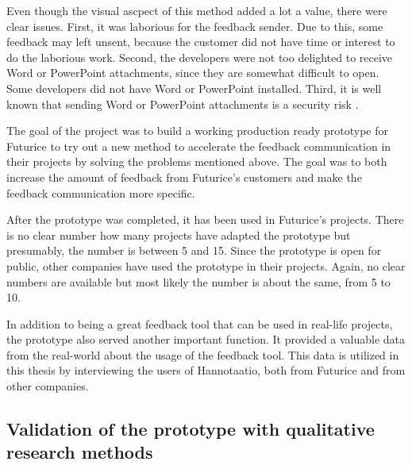 \documentclass[english,12pt,a4paper,pdftex]{article}
\begin{document}
Even though the visual ascpect of this method added a lot a value, there were clear issues. First, it was laborious for the feedback sender. Due to this, some feedback may left unsent, because the customer did not have time or interest to do the laborious work. Second, the developers were not too delighted to receive Word or PowerPoint attachments, since they are somewhat difficult to open. Some developers did not have Word or PowerPoint installed. Third, it is well known that sending Word or PowerPoint attachments is a security risk \citep{tyson2011}.

The goal of the project was to build a working production ready prototype for Futurice to try out a new method to accelerate the feedback communication in their projects by solving the problems mentioned above. The goal was to both increase the amount of feedback from Futurice's customers and make the feedback communication more specific.

After the prototype was completed, it has been used in Futurice's projects. There is no clear number how many projects have adapted the prototype but presumably, the number is between 5 and 15. Since the prototype is open for public, other companies have used the prototype in their projects. Again, no clear numbers are available but most likely the number is about the same, from 5 to 10.

In addition to being a great feedback tool that can be used in real-life projects, the prototype also served another important function. It provided a valuable data from the real-world about the usage of the feedback tool. This data is utilized in this thesis by interviewing the users of Hannotaatio, both from Futurice and from other companies.

\subsection{Validation of the prototype with qualitative research methods}
\end{document}
